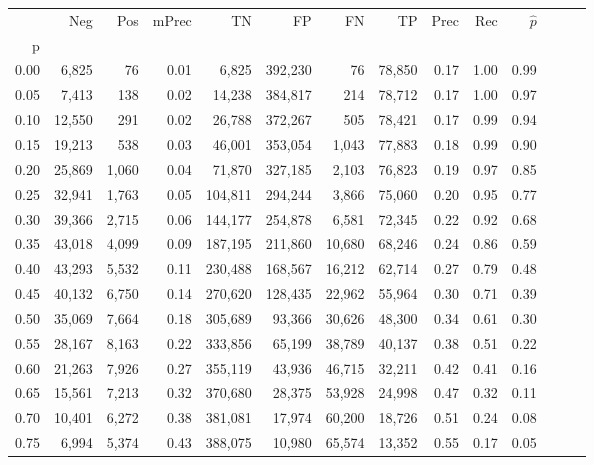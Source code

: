 \begin{tabular}{rrrrrrrrrrrrrr}
\toprule
{} &     Neg &    Pos & mPrec &       TN &       FP &      FN &      TP &  Prec &   Rec & $\hat{p}$ \\
p    &         &        &       &          &          &         &         &       &       &           \\
\midrule
0.00 &   6,825 &     76 &  0.01 &    6,825 &  392,230 &      76 &  78,850 &  0.17 &  1.00 &      0.99 \\
0.05 &   7,413 &    138 &  0.02 &   14,238 &  384,817 &     214 &  78,712 &  0.17 &  1.00 &      0.97 \\
0.10 &  12,550 &    291 &  0.02 &   26,788 &  372,267 &     505 &  78,421 &  0.17 &  0.99 &      0.94 \\
0.15 &  19,213 &    538 &  0.03 &   46,001 &  353,054 &   1,043 &  77,883 &  0.18 &  0.99 &      0.90 \\
0.20 &  25,869 &  1,060 &  0.04 &   71,870 &  327,185 &   2,103 &  76,823 &  0.19 &  0.97 &      0.85 \\
0.25 &  32,941 &  1,763 &  0.05 &  104,811 &  294,244 &   3,866 &  75,060 &  0.20 &  0.95 &      0.77 \\
0.30 &  39,366 &  2,715 &  0.06 &  144,177 &  254,878 &   6,581 &  72,345 &  0.22 &  0.92 &      0.68 \\
0.35 &  43,018 &  4,099 &  0.09 &  187,195 &  211,860 &  10,680 &  68,246 &  0.24 &  0.86 &      0.59 \\
0.40 &  43,293 &  5,532 &  0.11 &  230,488 &  168,567 &  16,212 &  62,714 &  0.27 &  0.79 &      0.48 \\
0.45 &  40,132 &  6,750 &  0.14 &  270,620 &  128,435 &  22,962 &  55,964 &  0.30 &  0.71 &      0.39 \\
0.50 &  35,069 &  7,664 &  0.18 &  305,689 &   93,366 &  30,626 &  48,300 &  0.34 &  0.61 &      0.30 \\
0.55 &  28,167 &  8,163 &  0.22 &  333,856 &   65,199 &  38,789 &  40,137 &  0.38 &  0.51 &      0.22 \\
0.60 &  21,263 &  7,926 &  0.27 &  355,119 &   43,936 &  46,715 &  32,211 &  0.42 &  0.41 &      0.16 \\
0.65 &  15,561 &  7,213 &  0.32 &  370,680 &   28,375 &  53,928 &  24,998 &  0.47 &  0.32 &      0.11 \\
0.70 &  10,401 &  6,272 &  0.38 &  381,081 &   17,974 &  60,200 &  18,726 &  0.51 &  0.24 &      0.08 \\
0.75 &   6,994 &  5,374 &  0.43 &  388,075 &   10,980 &  65,574 &  13,352 &  0.55 &  0.17 &      0.05 \\

\end{tabular}
